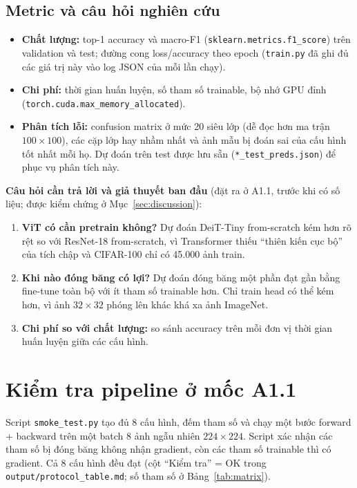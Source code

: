 \documentclass[12pt]{article}
\newcommand{\code}[1]{\texttt{#1}}
\newcommand{\st}[1]{\textbf{#1}}
\begin{document}
\subsection{Metric và câu hỏi nghiên cứu}
\begin{itemize}
  \item \st{Chất lượng:} top-1 accuracy và macro-F1 (\code{sklearn.metrics.f1\_score}) trên validation và test;
        đường cong loss/accuracy theo epoch (\code{train.py} đã ghi đủ các giá trị này vào log JSON của mỗi lần chạy).
  \item \st{Chi phí:} thời gian huấn luyện, số tham số trainable, bộ nhớ GPU đỉnh (\code{torch.cuda.max\_memory\_allocated}).
  \item \st{Phân tích lỗi:} confusion matrix ở mức 20 siêu lớp (dễ đọc hơn ma trận $100\times100$), các cặp lớp hay nhầm
        nhất và ảnh mẫu bị đoán sai của cấu hình tốt nhất mỗi họ. Dự đoán trên test được lưu sẵn
        (\code{*\_test\_preds.json}) để phục vụ phân tích này.
\end{itemize}

\textbf{Câu hỏi cần trả lời và giả thuyết ban đầu} (đặt ra ở A1.1, trước khi có số liệu; được kiểm chứng ở
Mục~\ref{sec:discussion}):
\begin{enumerate}
  \item \st{ViT có cần pretrain không?} Dự đoán DeiT-Tiny from-scratch kém hơn rõ rệt so với ResNet-18 from-scratch,
        vì Transformer thiếu ``thiên kiến cục bộ'' của tích chập và CIFAR-100 chỉ có 45.000 ảnh train.
  \item \st{Khi nào đóng băng có lợi?} Dự đoán đóng băng một phần đạt gần bằng fine-tune toàn bộ với ít tham số trainable
        hơn. Chỉ train head có thể kém hơn, vì ảnh $32\times32$ phóng lên khác khá xa ảnh ImageNet.
  \item \st{Chi phí so với chất lượng:} so sánh accuracy trên mỗi đơn vị thời gian huấn luyện giữa các cấu hình.
\end{enumerate}

\section{Kiểm tra pipeline ở mốc A1.1}
Script \code{smoke\_test.py} tạo đủ 8 cấu hình, đếm tham số và chạy một bước forward + backward trên một batch 8 ảnh
ngẫu nhiên $224\times224$. Script xác nhận các tham số bị đóng băng không nhận gradient, còn các tham số trainable thì có
gradient. Cả 8 cấu hình đều đạt (cột ``Kiểm tra'' = OK trong \code{output/protocol\_table.md}; số tham số ở
Bảng~\ref{tab:matrix}).
\end{document}
